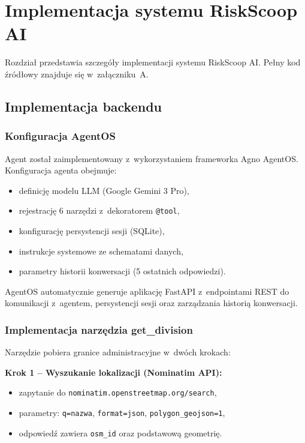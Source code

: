 \section{Implementacja systemu RiskScoop AI}
\label{chap:implementacja}

Rozdział przedstawia szczegóły implementacji systemu RiskScoop AI. Pełny kod źródłowy znajduje się w~załączniku~A.

\subsection{Implementacja backendu}

\subsubsection{Konfiguracja AgentOS}

Agent został zaimplementowany z~wykorzystaniem frameworka Agno AgentOS. Konfiguracja agenta obejmuje:

\begin{itemize}
    \item definicję modelu LLM (Google Gemini 3 Pro),
    \item rejestrację 6 narzędzi z~dekoratorem \texttt{@tool},
    \item konfigurację persystencji sesji (SQLite),
    \item instrukcje systemowe ze schematami danych,
    \item parametry historii konwersacji (5 ostatnich odpowiedzi).
\end{itemize}

AgentOS automatycznie generuje aplikację FastAPI z~endpointami REST do komunikacji z~agentem, persystencji sesji oraz zarządzania historią konwersacji.

\subsubsection{Implementacja narzędzia get\_division}

Narzędzie pobiera granice administracyjne w~dwóch krokach:

\textbf{Krok 1 -- Wyszukanie lokalizacji (Nominatim API):}
\begin{itemize}
    \item zapytanie do \texttt{nominatim.openstreetmap.org/search},
    \item parametry: \texttt{q=nazwa}, \texttt{format=json}, \texttt{polygon\_geojson=1},
    \item odpowiedź zawiera \texttt{osm\_id} oraz podstawową geometrię.
\end{itemize}

